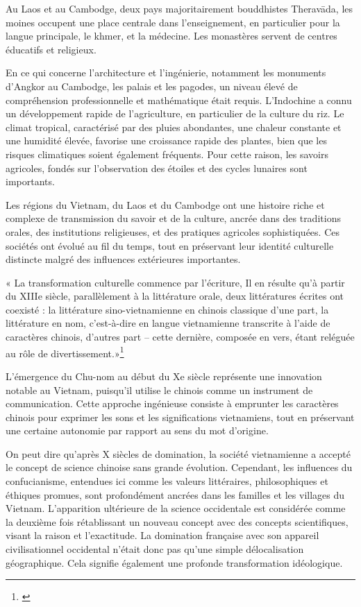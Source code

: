 Au Laos et au Cambodge, deux pays majoritairement bouddhistes Theravāda, les moines occupent une place centrale dans l'enseignement, en particulier pour la langue principale, le khmer, et la médecine. Les monastères servent de centres éducatifs et religieux.

En ce qui concerne l'architecture et l'ingénierie, notamment les monuments d'Angkor au Cambodge, les palais et les pagodes, un niveau élevé de compréhension professionnelle et mathématique était requis. L'Indochine a connu un développement rapide de l'agriculture, en particulier de la culture du riz. Le climat tropical, caractérisé par des pluies abondantes, une chaleur constante et une humidité élevée, favorise une croissance rapide des plantes, bien que les risques climatiques soient également fréquents. Pour cette raison, les savoirs agricoles, fondés sur l'observation des étoiles et des cycles lunaires sont importants.

Les régions du Vietnam, du Laos et du Cambodge ont une histoire riche et complexe de transmission du savoir et de la culture, ancrée dans des traditions orales, des institutions religieuses, et des pratiques agricoles sophistiquées. Ces sociétés ont évolué au fil du temps, tout en préservant leur identité culturelle distincte malgré des influences extérieures importantes.

« La transformation culturelle commence par l'écriture,
Il en résulte qu'à partir du XIIIe siècle, parallèlement à la littérature orale, deux littératures écrites ont coexisté : la littérature sino-vietnamienne en chinois classique d'une part, la littérature en nom, c'est-à-dire en langue vietnamienne transcrite à l'aide de caractères chinois, d'autres part – cette dernière, composée en vers, étant reléguée au rôle de divertissement.»\footnote{\cite{tung}}

L'émergence du Chu-nom au début du Xe siècle représente une innovation notable au Vietnam, puisqu'il utilise le chinois comme un instrument de communication. Cette approche ingénieuse consiste à emprunter les caractères chinois pour exprimer les sons et les significations vietnamiens, tout en préservant une certaine autonomie par rapport au sens du mot d'origine.

On peut dire qu’après X siècles de domination, la société vietnamienne a accepté le concept de science chinoise sans grande évolution. Cependant, les influences du confucianisme, entendues ici comme les valeurs littéraires, philosophiques et éthiques promues, sont profondément ancrées dans les familles et les villages du Vietnam. L'apparition ultérieure de la science occidentale est considérée comme la deuxième fois rétablissant un nouveau concept avec des concepts scientifiques, visant la raison et l'exactitude. La domination française avec son appareil civilisationnel occidental n’était donc pas qu’une simple délocalisation géographique. Cela signifie également une profonde transformation idéologique.

